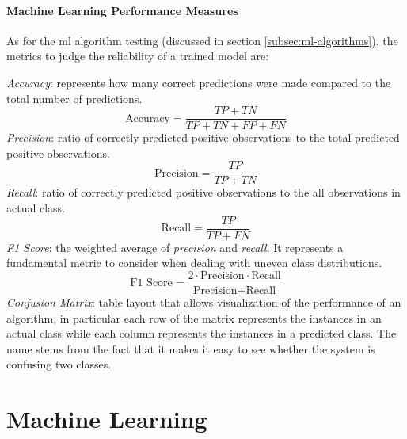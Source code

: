 \paragraph{Machine Learning Performance Measures} As for the \gls{ml} algorithm testing (discussed in section \ref{subsec:ml-algorithms}), the metrics to judge the reliability of a trained model are:

\begin{itemize}
    \itemAR \textit{Accuracy}: represents how many correct predictions were made compared to the total number of predictions.
    \begin{equation}
        \text{Accuracy}=\frac{TP+TN}{TP+TN+FP+FN}
    \end{equation}
    \itemAR \textit{Precision}: ratio of correctly predicted positive observations to the total predicted positive observations.
    \begin{equation}
        \text{Precision}=\frac{TP}{TP+TN}
    \end{equation}
    \itemAR \textit{Recall}: ratio of correctly predicted positive observations to the all observations in actual class.
    \begin{equation}
        \text{Recall}=\frac{TP}{TP+FN}
    \end{equation}
    \itemAR \textit{F1 Score}: the weighted average of \textit{precision} and \textit{recall}. It represents a fundamental metric to consider when dealing with uneven class distributions.
    \begin{equation}
        \text{F1 Score}=\frac{2\cdot \text{Precision}\cdot \text{Recall}}{\text{Precision}+ \text{Recall}}
    \end{equation}
    \itemAR \textit{Confusion Matrix}: table layout that allows visualization of the performance of an algorithm, in particular each row of the matrix represents the instances in an actual class while each column represents the instances in a predicted class. The name stems from the fact that it makes it easy to see whether the system is confusing two classes.
\end{itemize}


\section{Machine Learning}
\label{sec:machine-learning}


